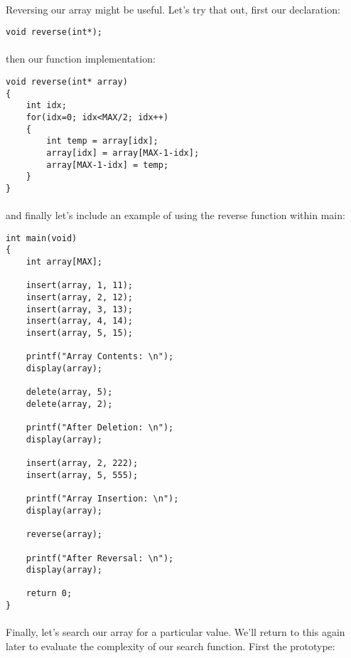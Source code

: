\documentclass[10pt, a4paper, twosize]{article}
\begin{document}
\paragraph{} Reversing our array might be useful. Let's try that out, first our declaration:

\begin{lstlisting}
void reverse(int*);
\end{lstlisting}

\paragraph{} then our function implementation:
\begin{lstlisting}
void reverse(int* array)
{
    int idx;
    for(idx=0; idx<MAX/2; idx++)
    {
        int temp = array[idx];
        array[idx] = array[MAX-1-idx];
        array[MAX-1-idx] = temp;
    }
}
\end{lstlisting}

\paragraph{} and finally let's include an example of using the reverse function within main:
\begin{lstlisting}
int main(void)
{
    int array[MAX];

    insert(array, 1, 11);
    insert(array, 2, 12);
    insert(array, 3, 13);
    insert(array, 4, 14);
    insert(array, 5, 15);

    printf("Array Contents: \n");
    display(array);

    delete(array, 5);
    delete(array, 2);

    printf("After Deletion: \n");
    display(array);

    insert(array, 2, 222);
    insert(array, 5, 555);

    printf("Array Insertion: \n");
    display(array);

    reverse(array);

    printf("After Reversal: \n");
    display(array);

    return 0;
}
\end{lstlisting}

\paragraph{} Finally, let's search our array for a particular value. We'll return to this again later to evaluate the complexity of our search function. First the prototype:
\end{document}
